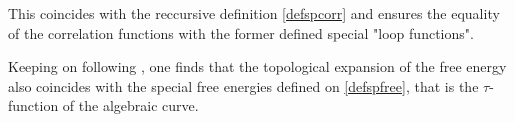 This coincides with the reccursive definition \ref{defspcorr} and ensures the equality of the correlation functions
with the former defined special "loop functions".

Keeping on following \cite{CEO}, one finds that the topological expansion of the free energy also coincides with the
special free energies defined on \ref{defspfree}, that is the $\tau$-function of the algebraic curve.



%
%
%
%
%
%
%
